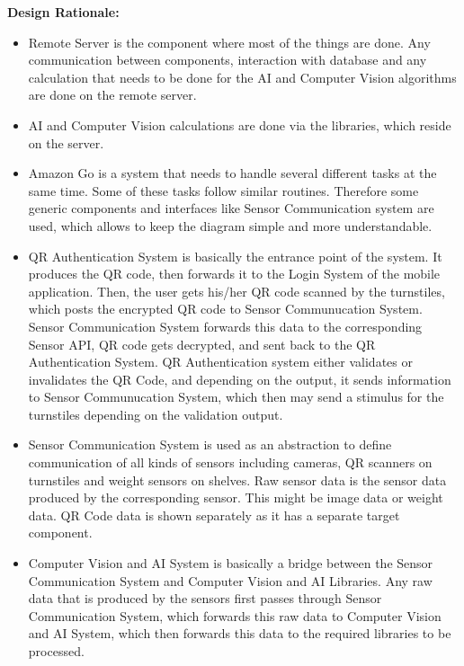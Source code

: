 \documentclass[11pt]{article}
\begin{document}
    \textbf{Design Rationale: \\}
    \begin{itemize}
        
        \item Remote Server is the component where most of the things are done. Any communication between components, interaction with database and any calculation 
        that needs to be done for the AI and Computer Vision algorithms are done on the remote server.
        
        \item AI and Computer Vision calculations are done via the libraries, which reside on the server.
        
        \item Amazon Go is a system that needs to handle several different tasks at the same time. Some of these tasks follow similar routines.
        Therefore some generic components and interfaces like Sensor Communication system are used, which allows to keep the diagram simple
        and more understandable.

        \item QR Authentication System is basically the entrance point of the system. It produces the QR code, then forwards it to the Login System of the mobile 
        application. Then, the user gets his/her QR code scanned by the turnstiles, which posts the encrypted QR code to Sensor Communucation System. Sensor 
        Communication System forwards this data to the corresponding Sensor API, QR code gets decrypted, and sent back to the QR Authentication System. 
        QR Authentication system either validates or invalidates the QR Code, and depending on the output, it sends information to Sensor Communucation System, 
        which then may send a stimulus for the turnstiles depending on the validation output.
        
        \item Sensor Communication System is used as an abstraction to define communication of all kinds of sensors including cameras, QR scanners on turnstiles 
        and weight sensors on shelves. Raw sensor data is the sensor data produced by the corresponding sensor. This might be image data or weight data. 
        QR Code data is shown separately as it has a separate target component.
        
        \item Computer Vision and AI System is basically a bridge between the Sensor Communication System and Computer Vision and AI Libraries. Any raw data that is 
        produced by the sensors first passes through Sensor Communication System, which forwards this raw data to Computer Vision and AI System, which then 
        forwards this data to the required libraries to be processed.
        

\end{itemize}
\end{document}
